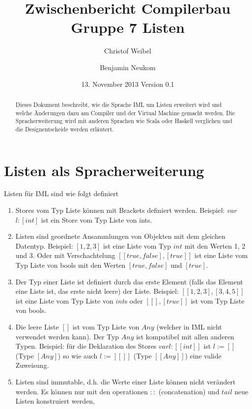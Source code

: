 \documentclass[a4paper,notitlepage,oneside]{scrartcl}
\title{Zwischenbericht Compilerbau Gruppe 7 Listen}
\author{Christof Weibel \and Benjamin Neukom}
\date{13. November 2013 Version 0.1}
\begin{document}
\maketitle

\begin{abstract}
Dieses  Dokument beschreibt, wie die Sprache IML um Listen erweitert wird und welche Änderungen dazu am Compiler und der Virtual Machine gemacht werden. Die Spracherweiterung wird mit anderen Sprachen wie Scala oder Haskell verglichen und die Designentscheide werden erläutert.
\end{abstract}


\section{Listen als Spracherweiterung}
Listen für IML sind wie folgt definiert

\begin{enumerate}
  \item Stores vom Typ Liste können mit Brackets definiert werden. Beispiel: $var$ $l:[int]$ ist ein Store vom Typ Liste von ints.
    
  \item Listen sind geordnete Ansammlungen von Objekten mit dem gleichen Datentyp. Beispiel: $[1,2,3]$ ist eine Liste vom Typ $int$ mit den Werten 1, 2 und 3. Oder mit Verschachtelung $[[true, false], [true]]$ ist eine Liste vom Typ Liste von bools mit den Werten $[true,false]$ und $[true]$.

  \item Der Typ einer Liste ist definiert durch das erste Element (falls das Element eine Liste ist, das erste nicht leere) der Liste. Beispiel:  $[[1,2,3],[3,4,5]]$ ist eine Liste vom Typ Liste von $int$s oder $[[], [true]]$ ist vom Typ Liste von bools.

  \item Die leere Liste $[]$ ist vom Typ Liste von $Any$ (welcher in IML nicht verwendet werden kann). Der Typ $Any$ ist kompatibel mit allen anderen Typen. Beispiel: für die Deklaration des Stores $var l:[[int]]$ ist $l := []$ (Type $[Any]$) so wie auch $l := [[]]$ (Type $[[Any]]$) eine valide Zuweisung.

  \item Listen sind immutable, d.h. die Werte einer Liste können nicht verändert werden. Es können nur mit den operationen $::$ (concatenation) und $tail$ neue Listen konstruiert werden,
\end{enumerate} 
\end{document}
